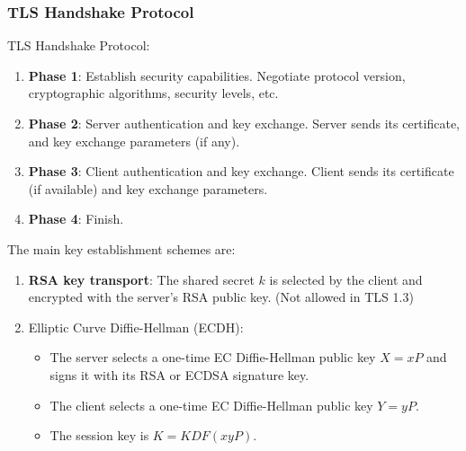 \documentclass[12pt,titlepage]{article}
\begin{document}
\subsubsection{TLS Handshake Protocol}
TLS Handshake Protocol: \begin{enumerate}
	\item \textbf{Phase 1}: Establish security capabilities. Negotiate protocol version, cryptographic algorithms, security levels, etc.
	\item \textbf{Phase 2}: Server authentication and key exchange. Server sends its certificate, and key exchange parameters (if any).
	\item \textbf{Phase 3}: Client authentication and key exchange. Client sends its certificate (if available) and key exchange parameters.
	\item \textbf{Phase 4}: Finish.
\end{enumerate}
The main key establishment schemes are:\begin{enumerate}
	\item \textbf{RSA key transport}: The shared secret $k$ is selected by the client and encrypted with the server’s RSA public key. (Not allowed in TLS 1.3)
	\item Elliptic Curve Diffie-Hellman (ECDH):\begin{itemize}
		\item The server selects a one-time EC Diffie-Hellman public key $X = xP$ and signs it with its RSA or ECDSA signature key.
		\item The client selects a one-time EC Diffie-Hellman public key $Y = yP$.
		\item The session key is $K = KDF(xyP)$.
	\end{itemize}
\end{enumerate}
\end{document}
